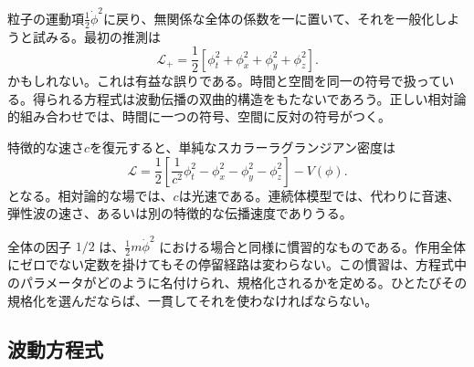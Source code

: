 粒子の運動項\(\tfrac12\dot\phi^2\)に戻り、無関係な全体の係数を一に置いて、それを一般化しようと試みる。最初の推測は
\begin{equation}
\mathcal{L}_{+}
=
\frac12
\left[
\phi_t^2+\phi_x^2+\phi_y^2+\phi_z^2
\right].
\label{eq:sr4-all-plus}
\end{equation}
かもしれない。これは有益な誤りである。時間と空間を同一の符号で扱っている。得られる方程式は波動伝播の双曲的構造をもたないであろう。正しい相対論的組み合わせでは、時間に一つの符号、空間に反対の符号がつく。

\begin{classroomqa}
\end{classroomqa}

特徴的な速さ\(c\)を復元すると、単純なスカラーラグランジアン密度は
\begin{equation}
\boxed{
\mathcal{L}
=
\frac12
\left[
\frac{1}{c^2}\phi_t^2
-\phi_x^2-\phi_y^2-\phi_z^2
\right]
-V(\phi)
}.
\label{eq:sr4-scalar-lagrangian}
\end{equation}
となる。相対論的な場では、\(c\)は光速である。連続体模型では、代わりに音速、弾性波の速さ、あるいは別の特徴的な伝播速度でありうる。

全体の因子 \(1/2\) は、\(\tfrac12m\dot\phi^2\) における場合と同様に慣習的なものである。作用全体にゼロでない定数を掛けてもその停留経路は変わらない。この慣習は、方程式中のパラメータがどのように名付けられ、規格化されるかを定める。ひとたびその規格化を選んだならば、一貫してそれを使わなければならない。

\begin{classroomqa}
\end{classroomqa}

\subsection{波動方程式}

